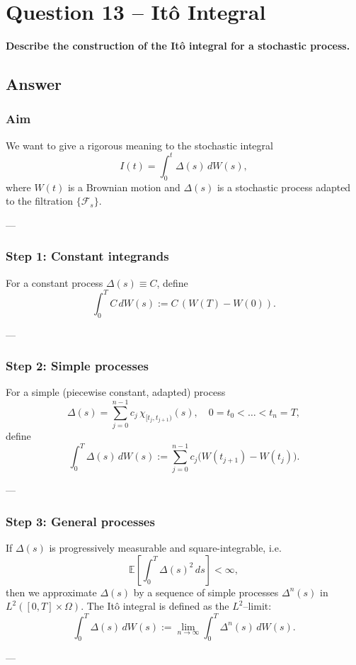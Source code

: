 \documentclass[12pt,a4paper]{book}
\theoremstyle{remark}
\newcommand{\EE}{\mathbb{E}}          %
\newcommand{\F}{\mathcal{F}}          %
\begin{document}
\newpage
\section{Question 13 -- Itô Integral}
\textbf{Describe the construction of the Itô integral for a stochastic process.}

\subsection*{Answer}

\subsubsection*{Aim}
We want to give a rigorous meaning to the stochastic integral
\[
I(t) = \int_0^t \Delta(s)\,dW(s),
\]
where $W(t)$ is a Brownian motion and $\Delta(s)$ is a stochastic process adapted to the filtration $\{\F_s\}$.

---

\subsubsection*{Step 1: Constant integrands}
For a constant process $\Delta(s) \equiv C$, define
\[
\int_0^T C\,dW(s) := C\,(W(T)-W(0)).
\]

---

\subsubsection*{Step 2: Simple processes}
For a simple (piecewise constant, adapted) process
\[
\Delta(s) = \sum_{j=0}^{n-1} c_j \,\chi_{[t_j,t_{j+1})}(s), \quad 0=t_0<\dots<t_n=T,
\]
define
\[
\int_0^T \Delta(s)\,dW(s) := \sum_{j=0}^{n-1} c_j \big(W(t_{j+1})-W(t_j)\big).
\]

---

\subsubsection*{Step 3: General processes}
If $\Delta(s)$ is progressively measurable and square-integrable, i.e.
\[
\EE\!\left[\int_0^T \Delta(s)^2 \,ds\right] < \infty,
\]
then we approximate $\Delta(s)$ by a sequence of simple processes $\Delta^n(s)$ in $L^2([0,T]\times\Omega)$.  
The Itô integral is defined as the $L^2$–limit:
\[
\int_0^T \Delta(s)\,dW(s) := \lim_{n\to\infty} \int_0^T \Delta^n(s)\,dW(s).
\]

---
\end{document}
